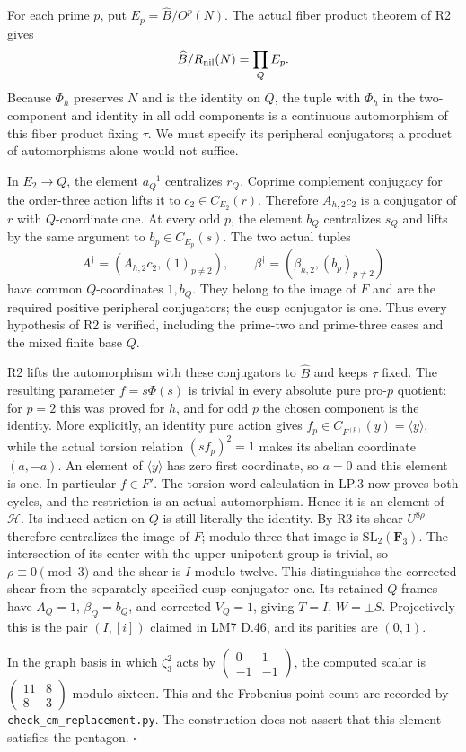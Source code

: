 For each prime $p$, put $E_p=\widehat B/O^p(N)$. The actual
fiber product theorem of R2 gives
\[
 \widehat B/R_{\rm nil}(N)=\prod_Q E_p.
\]
Because $\Phi_h$ preserves $N$ and is the identity on $Q$,
the tuple with $\Phi_h$ in the two-component and identity in
all odd components is a continuous automorphism of this
fiber product fixing $\tau$. We must specify its peripheral
conjugators; a product of automorphisms alone would not suffice.

In $E_2\to Q$, the element $a_Q^{-1}$ centralizes $r_Q$.
Coprime complement conjugacy for the order-three action lifts
it to $c_2\in C_{E_2}(r)$. Therefore $A_{h,2}c_2$ is a
conjugator of $r$ with $Q$-coordinate one. At every odd $p$,
the element $b_Q$ centralizes $s_Q$ and lifts by the same
argument to $b_p\in C_{E_p}(s)$. The two actual tuples
\[
 A^\dagger=(A_{h,2}c_2,(1)_{p\ne2}),\qquad
 \beta^\dagger=(\beta_{h,2},(b_p)_{p\ne2})
\]
have common $Q$-coordinates $1,b_Q$. They belong to the image
of $F$ and are the required positive peripheral conjugators;
the cusp conjugator is one. Thus every hypothesis of R2 is
verified, including the prime-two and prime-three cases and
the mixed finite base $Q$.

R2 lifts the automorphism with these conjugators to $\widehat B$
and keeps $\tau$ fixed. The resulting parameter $f=s\Phi(s)$
is trivial in every absolute pure pro-$p$ quotient: for $p=2$
this was proved for $h$, and for odd $p$ the chosen component
is the identity. More explicitly, an identity pure action gives
$f_p\in C_{F^{(p)}}(y)=\langle y\rangle$, while the actual
torsion relation $(sf_p)^2=1$ makes its abelian coordinate
$(a,-a)$. An element of $\langle y\rangle$ has zero first
coordinate, so $a=0$ and this element is one.
In particular $f\in F'$. The torsion word
calculation in LP.3 now proves both cycles, and the restriction
is an actual automorphism. Hence it is an element of $\mathcal H$.
Its induced action on $Q$ is still literally the identity.
By R3 its shear $U^{8\rho}$ therefore centralizes the image of
$F$; modulo three that image is $\mathrm{SL}_2(\mathbf F_3)$.
The intersection of its center with the upper unipotent group
is trivial, so $\rho\equiv0\pmod3$ and the shear is $I$
modulo twelve. This distinguishes the corrected shear from the
separately specified cusp conjugator one.
Its retained $Q$-frames have $A_Q=1$, $\beta_Q=b_Q$, and
corrected $V_Q=1$, giving $T=I$, $W=\pm S$. Projectively this is the
pair $(I,[i])$ claimed in LM7 D.46, and its parities are $(0,1)$.

In the graph basis in which $\zeta_3^2$ acts by
$\left(\begin{smallmatrix}0&1\\-1&-1\end{smallmatrix}\right)$,
the computed scalar is
$\left(\begin{smallmatrix}11&8\\8&3\end{smallmatrix}\right)$
modulo sixteen. This and the Frobenius point count are recorded
by \texttt{check\_cm\_replacement.py}. The construction does
not assert that this element satisfies the pentagon.
\hfill$\square$

